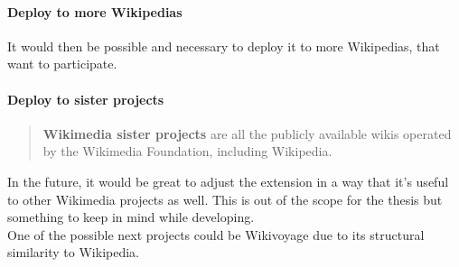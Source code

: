 \paragraph{Deploy to more Wikipedias}
It would then be possible and necessary to deploy it to more Wikipedias, that want to participate. 

\paragraph{Deploy to sister projects}
\begin{quote}
\textbf{Wikimedia sister projects} are all the publicly available wikis operated by the Wikimedia Foundation, including Wikipedia. 
\end{quote} \citep{wiki:29}
In the future, it would be great to adjust the extension in a way that it's useful to other Wikimedia projects as well. This is out of the scope for the thesis but something to keep in mind while developing. \\
One of the possible next projects could be Wikivoyage due to its structural similarity to Wikipedia.